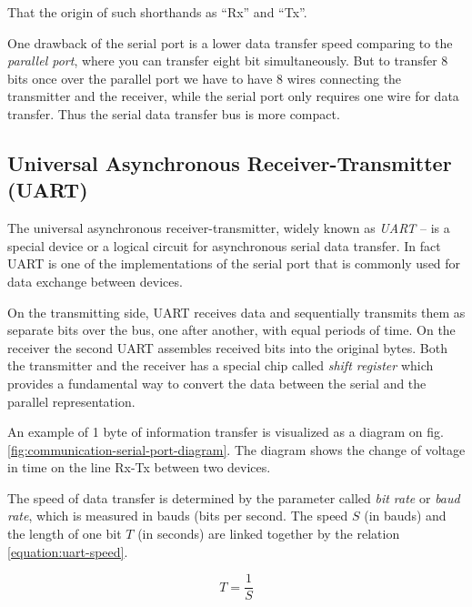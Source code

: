 \documentclass[../sparc.tex]{subfiles}
\begin{document}
That the origin of such shorthands as ``Rx'' and ``Tx''.\autocite{so:krisw}

One drawback of the serial port is a lower data transfer speed comparing to the
\emph{parallel port}, where you can transfer eight bit simultaneously.  But to
transfer 8 bits once over the parallel port we have to have 8 wires connecting
the transmitter and the receiver, while the serial port only requires one wire
for data transfer.  Thus the serial data transfer bus is more compact.

\subsection{Universal Asynchronous Receiver-Transmitter (UART)}
\label{section:communication-uart}

The universal asynchronous receiver-transmitter, widely known as \emph{UART} --
is a special device or a logical circuit for asynchronous serial data transfer.
In fact UART is one of the implementations of the serial port that is commonly
used for data exchange between devices.

On the transmitting side, UART receives data and sequentially transmits them as
separate bits over the bus, one after another, with equal periods of time.  On
the receiver the second UART assembles received bits into the original bytes.
Both the transmitter and the receiver has a special chip called \emph{shift
register} which provides a fundamental way to convert the data between the
serial and the parallel representation.


An example of 1 byte of information transfer is visualized as a diagram on fig.
\ref{fig:communication-serial-port-diagram}.  The diagram shows the change of
voltage in time on the line Rx-Tx between two devices.


The speed of data transfer is determined by the parameter called \emph{bit rate}
or \emph{baud rate}, which is measured in bauds (bits per second.  The speed $S$
(in bauds) and the length of one bit $T$ (in seconds) are linked together by the
relation \ref{equation:uart-speed}.

\begin{equation}
  T = \frac{1}{S}
  \label{equation:uart-speed}
\end{equation}
\end{document}
